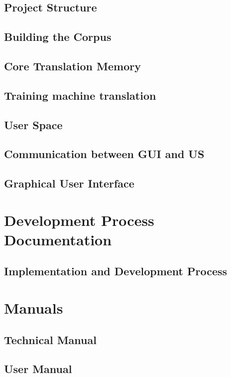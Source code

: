 \documentclass[11pt, oneside]{book}
\begin{document}
\chapter{Project Structure}


%

\chapter{Building the Corpus}


\chapter{Core Translation Memory}


\chapter{Training machine translation}


\chapter{User Space}


\chapter{Communication between GUI and US}


\chapter{Graphical User Interface}


\label{part:manuals}

\part{Development Process Documentation}

\chapter{Implementation and Development Process}


\part{Manuals}

\chapter{Technical Manual}


\chapter{User Manual}

\end{document}
